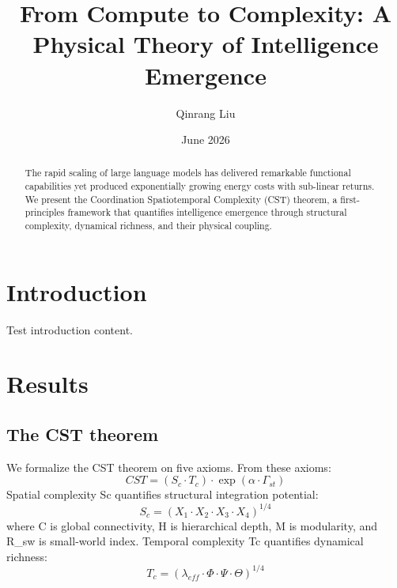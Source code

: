 \documentclass[a4paper,12pt]{article}
\title{From Compute to Complexity: A Physical Theory of Intelligence Emergence}
\author{Qinrang Liu}
\date{June 2026}
\begin{document}
\maketitle
\begin{abstract}
The rapid scaling of large language models has delivered remarkable functional capabilities yet produced exponentially growing energy costs with sub-linear returns. We present the Coordination Spatiotemporal Complexity (CST) theorem, a first-principles framework that quantifies intelligence emergence through structural complexity, dynamical richness, and their physical coupling.
\end{abstract}
\section{Introduction}
Test introduction content.
\section{Results}
\subsection{The CST theorem}
We formalize the CST theorem on five axioms.
From these axioms:
\begin{equation}
CST = (S_c \cdot T_c) \cdot \exp(\alpha \cdot \Gamma_{st}) \tag{1}
\end{equation}
Spatial complexity Sc quantifies structural integration potential:
\begin{equation}
S_c = (X_1 \cdot X_2 \cdot X_3 \cdot X_4)^{1/4} \tag{2}
\end{equation}
where C is global connectivity, H is hierarchical depth, M is modularity, and R_{sw} is small-world index.
Temporal complexity Tc quantifies dynamical richness:
\begin{equation}
T_c = (\lambda_{eff} \cdot \Phi \cdot \Psi \cdot \Theta)^{1/4} \tag{3}
\end{equation}
\end{document}
